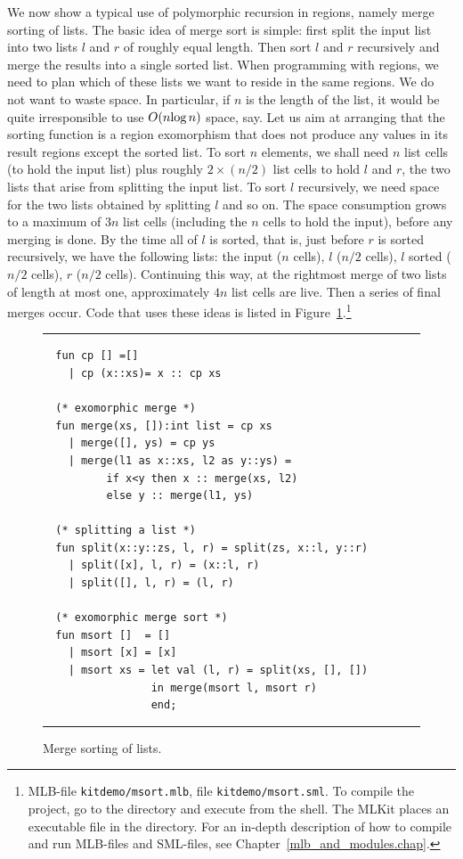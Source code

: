 \documentclass[12pt]{book}
\begin{document}
We now show a typical use of polymorphic recursion in regions, namely
merge sorting of lists. The basic idea of merge sort is simple: first
split the input list into two lists $l$ and $r$ of roughly equal
length.  Then sort $l$ and $r$ recursively and merge the results into
a single sorted list.  When programming with regions, we need to plan
which of these lists we want to reside in the same regions. We do not
want to waste space. In particular, if $n$ is the length of the list,
it would be quite irresponsible to use $O(n\hbox{log}\,n)$ space, say.
Let us aim at arranging that the sorting function is a region
exomorphism that does not produce any values in its result regions
except the sorted list. To sort $n$ elements, we shall need $n$ list
cells (to hold the input list) plus roughly $2\times(n/2)$ list cells
to hold $l$ and $r$, the two lists that arise from splitting the input
list. To sort $l$ recursively, we need space for the two lists
obtained by splitting $l$ and so on. The space consumption grows to a
maximum of $3n$ list cells (including the $n$ cells to hold the
input), before any merging is done.  By the time all of $l$ is sorted,
that is, just before $r$ is sorted recursively, we have the following
lists: the input ($n$ cells), $l$ ($n/2$ cells), $l$ sorted ($n/2$
cells), $r$ ($n/2$ cells). Continuing this way, at the rightmost merge
of two lists of length at most one, approximately $4n$ list cells are
live.  Then a series of final merges occur.  Code that uses these
ideas is listed in
%
%
%
%
%
Figure~\ref{msort.fig}.\footnote{MLB-file {\tt kitdemo/msort.mlb}, file
  {\tt kitdemo/msort.sml}. To compile the project, go to the
   directory and execute  from
  the shell. The MLKit places an executable file  in the
   directory. For an in-depth description of how to
  compile and run MLB-files and SML-files, see
  Chapter~\ref{mlb_and_modules.chap}.}
\begin{figure}[hbt]
\hrule
\medskip
\begin{verbatim}
  fun cp [] =[]
    | cp (x::xs)= x :: cp xs

  (* exomorphic merge *)
  fun merge(xs, []):int list = cp xs
    | merge([], ys) = cp ys
    | merge(l1 as x::xs, l2 as y::ys) =
          if x<y then x :: merge(xs, l2)
          else y :: merge(l1, ys)

  (* splitting a list *)
  fun split(x::y::zs, l, r) = split(zs, x::l, y::r)
    | split([x], l, r) = (x::l, r)
    | split([], l, r) = (l, r)

  (* exomorphic merge sort *)
  fun msort []  = []
    | msort [x] = [x]
    | msort xs = let val (l, r) = split(xs, [], [])
                 in merge(msort l, msort r)
                 end;
\end{verbatim}
\caption{Merge sorting of lists.}
\label{msort.fig}
\medskip\hrule
\end{figure}
\end{document}
